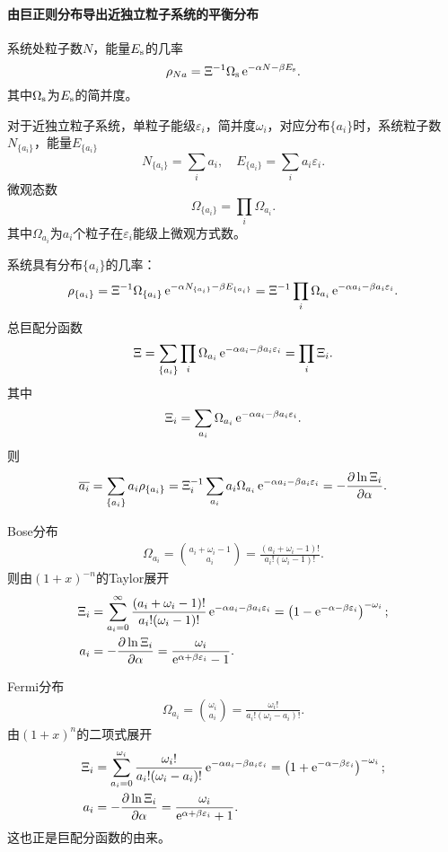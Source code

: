 \paragraph*{由巨正则分布导出近独立粒子系统的平衡分布}系统处粒子数$N$，能量$E_\mathrm s$的几率
\[
	\rho_{Na}=\Xi^{-1}\Omega_\mathrm s\mathop{}\!\mathrm{e}^{-\alpha N-\beta E_\mathrm s}.
\]
其中$\Omega_\mathrm s$为$E_\mathrm s$的简并度。

对于近独立粒子系统，单粒子能级$\varepsilon_i$，简并度$\omega_i$，对应分布$\{a_i\}$时，系统粒子数$N_{\{a_i\}}$，能量$E_{\{a_i\}}$
\[
	N_{\{a_i\}}=\sum_ia_i,\quad E_{\{a_i\}}=\sum_ia_i\varepsilon_i.
\]
微观态数
\[
	\Omega_{\{a_i\}}=\prod_i\Omega_{a_i}.
\]
其中$\Omega_{a_i}$为$a_i$个粒子在$\varepsilon_i$能级上微观方式数。

系统具有分布$\{a_i\}$的几率：
\[
	\rho_{\{a_i\}}=\Xi^{-1}\Omega_{\{a_i\}}\mathop{}\!\mathrm{e}^{-\alpha N_{\{a_i\}}-\beta E_{\{a_i\}}}=\Xi^{-1}\prod_i\Omega_{a_i}\mathop{}\!\mathrm{e}^{-\alpha{a_i}-\beta{a_i\varepsilon_i}}.
\]
总巨配分函数
\[
	\Xi=\sum_{\{a_i\}}\prod_i\Omega_{a_i}\mathop{}\!\mathrm{e}^{-\alpha{a_i}-\beta{a_i\varepsilon_i}}=\prod_i\Xi_i.
\]
其中 
\[
	\Xi_i=\sum_{a_i}\Omega_{a_i}\mathop{}\!\mathrm{e}^{-\alpha{a_i}-\beta{a_i\varepsilon_i}}.
\]
则
\begin{align*}
	\overline{a_i}=\sum_{\{a_i\}}a_i\rho_{\{a_i\}}=\Xi_i^{-1}\sum_{a_i}a_i\Omega_{a_i}\mathop{}\!\mathrm{e}^{-\alpha{a_i}-\beta{a_i\varepsilon_i}}=-\frac{\partial^{\;\!\!}\ln\Xi_i}{\partial \alpha^{\;\!\!}}.
\end{align*}

Bose分布
\begin{align}
	\Omega_{a_i}=\binom{a_i+\omega_i-1}{a_i}=\frac{(a_i+\omega_i-1)!}{a_i!(\omega_i-1)!}.
\end{align}
则由$(1+x)^{-n}$的Taylor展开
\begin{align}
	\Xi_i&=\sum_{a_i=0}^\infty\frac{(a_i+\omega_i-1)!}{a_i!(\omega_i-1)!}\mathop{}\!\mathrm{e}^{-\alpha a_i-\beta a_i\varepsilon_i}=\left(1-\mathop{}\!\mathrm{e}^{-\alpha-\beta\varepsilon_i}\right)^{-\omega_i};\\
	a_i&=-\frac{\partial^{\;\!\!}\ln\Xi_i}{\partial \alpha^{\;\!\!}}=\frac{\omega_i}{\mathop{}\!\mathrm{e}^{\alpha+\beta\varepsilon_i}-1}.
\end{align}

Fermi分布
\begin{align}
	\Omega_{a_i}=\binom{\omega_i}{a_i}=\frac{\omega_i!}{a_i!(\omega_i-a_i)!}.
\end{align}
由$(1+x)^n$的二项式展开
\begin{align}
	\Xi_i&=\sum_{a_i=0}^{\omega_i}\frac{\omega_i!}{a_i!(\omega_i-a_i)!}\mathop{}\!\mathrm{e}^{-\alpha a_i-\beta a_i\varepsilon_i}=\left(1+\mathop{}\!\mathrm{e}^{-\alpha-\beta\varepsilon_i}\right)^{-\omega_i};\\
	a_i&=-\frac{\partial^{\;\!\!}\ln\Xi_i}{\partial \alpha^{\;\!\!}}=\frac{\omega_i}{\mathop{}\!\mathrm{e}^{\alpha+\beta\varepsilon_i}+1}.
\end{align}
这也正是巨配分函数的由来。

